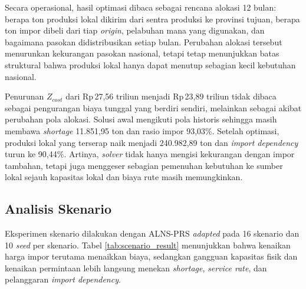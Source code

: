 \documentclass[journal]{IEEEtran}
\theoremstyle{definition}
\theoremstyle{definition}
\theoremstyle{plain}
\begin{document}
    \begin{table}[H]
    \centering
    \caption{Perbandingan solusi awal dan ALNS-PRS adapted}
    \label{tab:main_result}
    \end{table}

    Secara operasional, hasil optimasi dibaca sebagai rencana alokasi 12 bulan: berapa ton produksi lokal dikirim dari sentra produksi ke provinsi tujuan, berapa ton impor dibeli dari tiap \textit{origin}, pelabuhan mana yang digunakan, dan bagaimana pasokan didistribusikan setiap bulan. Perubahan alokasi tersebut menurunkan kekurangan pasokan nasional, tetapi tetap menunjukkan batas struktural bahwa produksi lokal hanya dapat menutup sebagian kecil kebutuhan nasional.

    Penurunan $Z_{cost}$ dari Rp\,27,56 triliun menjadi Rp\,23,89 triliun tidak dibaca sebagai pengurangan biaya tunggal yang berdiri sendiri, melainkan sebagai akibat perubahan pola alokasi. Solusi awal mengikuti pola historis sehingga masih membawa \textit{shortage} 11.851,95 ton dan rasio impor 93,03\%. Setelah optimasi, produksi lokal yang terserap naik menjadi 240.982,89 ton dan \textit{import dependency} turun ke 90,44\%. Artinya, \textit{solver} tidak hanya mengisi kekurangan dengan impor tambahan, tetapi juga menggeser sebagian pemenuhan kebutuhan ke sumber lokal sejauh kapasitas lokal dan biaya rute masih memungkinkan.

    \subsection{Analisis Skenario}
    Eksperimen skenario dilakukan dengan ALNS-PRS \textit{adapted} pada 16 skenario dan 10 \textit{seed} per skenario. Tabel \ref{tab:scenario_result} menunjukkan bahwa kenaikan harga impor terutama menaikkan biaya, sedangkan gangguan kapasitas fisik dan kenaikan permintaan lebih langsung menekan \textit{shortage}, \textit{service rate}, dan pelanggaran \textit{import dependency}.
\end{document}
